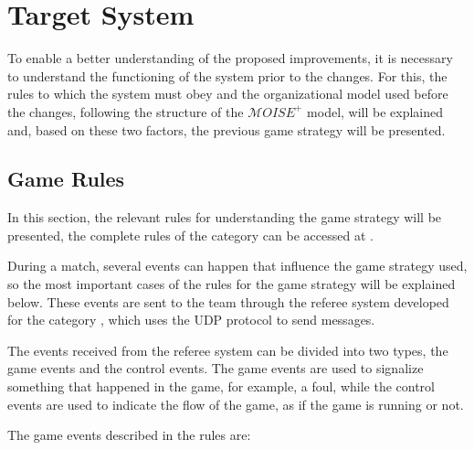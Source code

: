 \chapter{Target System}
\label{ch:target_system}

\def \MOISEp {$\mathcal{M}OISE^+$} 

To enable a better understanding of the proposed improvements, it is necessary to understand the functioning of the system prior to the changes. For this, the rules to which the system must obey and the organizational model used before the changes, following the structure of the \MOISEp \cite{MOISEp} model, will be explained and, based on these two factors, the previous game strategy will be presented.

\section{Game Rules}
\label{sec:rules}

In this section, the relevant rules for understanding the game strategy will be presented, the complete rules of the category can be accessed at \cite{RulesVSSS}.

During a match, several events can happen that influence the game strategy used, so the most important cases of the rules for the game strategy will be explained below. These events are sent to the team through the referee system developed for the category \cite{VSSReferee}, which uses the UDP protocol to send messages.

The events received from the referee system can be divided into two types, the game events and the control events. The game events are used to signalize something that happened in the game, for example, a foul, while the control events are used to indicate the flow of the game, as if the game is running or not.

The game events described in the rules are:

